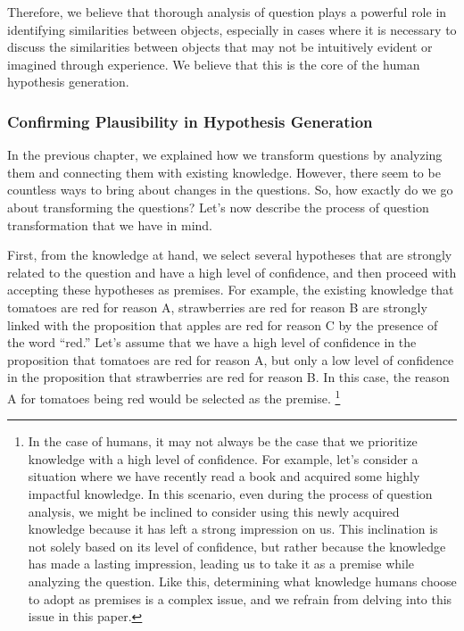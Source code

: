 \documentclass{book}
\begin{document}
Therefore, we believe that thorough analysis of question plays a powerful role in identifying similarities between objects, especially in cases where it is necessary to discuss the similarities between objects that may not be intuitively evident or imagined through experience. We believe that this is the core of the human hypothesis generation.

\subsubsection{Confirming Plausibility in Hypothesis Generation}

In the previous chapter, we explained how we transform questions by analyzing them and connecting them with existing knowledge. However, there seem to be countless ways to bring about changes in the questions. So, how exactly do we go about transforming the questions? Let's now describe the process of question transformation that we have in mind.


First, from the knowledge at hand, we select several hypotheses that are strongly related to the question and have a high level of confidence, and then proceed with accepting these hypotheses as premises. For example, the existing knowledge that tomatoes are red for reason A, strawberries are red for reason B  are strongly linked with the proposition that apples are red for reason C by the presence of the word ``red.'' Let's assume that we have a high level of confidence in the proposition that tomatoes are red for reason A, but only a low level of confidence in the proposition that strawberries are red for reason B. In this case, the reason A for tomatoes being red would be selected as the premise. \footnote{
In the case of humans, it may not always be the case that we prioritize knowledge with a high level of confidence. For example, let's consider a situation where we have recently read a book and acquired some highly impactful knowledge. In this scenario, even during the process of question analysis, we might be inclined to consider using this newly acquired knowledge because it has left a strong impression on us. This inclination is not solely based on its level of confidence, but rather because the knowledge has made a lasting impression, leading us to take it as a premise while analyzing the question. Like this, determining what knowledge humans choose to adopt as premises is a complex issue, and we refrain from delving into this issue in this paper.
}
\end{document}
